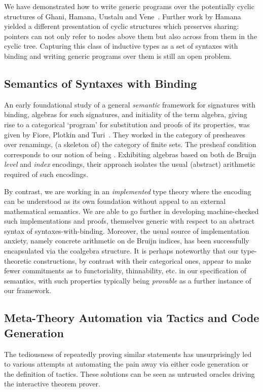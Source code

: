 {We have demonstrated how to write generic programs over the potentially
cyclic structures of Ghani, Hamana, Uustalu and Vene~\citeyear{ghani2006representing}.
Further work by Hamana~\citeyear{Hamana2009} yielded a different presentation
of cyclic structures which preserves sharing: pointers can not only refer
to nodes above them but also across from them in the cyclic tree. Capturing
this class of inductive types as a set of syntaxes with binding and writing
generic programs over them is still an open problem.

\subsection{Semantics of Syntaxes with Binding} An early foundational study
of a general \emph{semantic} framework for signatures with binding, algebras
for such signatures, and initiality of the term algebra, giving rise to a
categorical `program' for substitution and proofs of its properties, was given
by Fiore, Plotkin and Turi~\cite{FiorePlotkinTuri99}. They worked in the category of presheaves
over renamings, (a skeleton of) the category of finite sets. The presheaf
condition corresponds to our notion of being . Exhibiting
algebras based on both de Bruijn \emph{level} and \emph{index} encodings,
their approach isolates the usual (abstract) arithmetic required of such encodings.

By contrast, we are working in an \emph{implemented} type theory where the
encoding can be understood as its own foundation without appeal to an external
mathematical semantics. We are able to go further in developing machine-checked
such implementations and proofs, themselves generic with respect to an abstract syntax
 of syntaxes-with-binding. Moreover, the usual source of implementation
anxiety, namely concrete arithmetic on de Bruijn indices, has been successfully
encapsulated via the  coalgebra structure. It is perhaps noteworthy that
our type-theoretic constructions, by contrast with their categorical ones,
appear to make fewer commitments as to functoriality, thinnability, etc. in our
specification of semantics, with such properties typically being \emph{provable}
as a further instance of our framework.

\subsection{Meta-Theory Automation via Tactics and Code Generation} The
tediousness of repeatedly
proving similar statements has unsurprisingly led to various attempts at
automating the pain away via either code generation or the definition of
tactics. These solutions can be seen as untrusted oracles driving the
interactive theorem prover.

}
